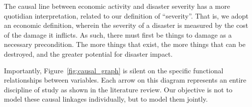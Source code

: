 The causal line between economic activity and disaster severity has a more quotidian interpretation, related to our definition of ``severity''. That is, we adopt an economic definition, wherein the severity of a disaster is measured by the cost of the damage it inflicts. As such, there must first be things to damage as a necessary precondition. The more things that exist, the more things that can be destroyed, and the greater potential for disaster impact.

Importantly, Figure~\ref{fig:causal_graph} is silent on the specific functional relationships between variables. Each arrow on this diagram represents an entire discipline of study as shown in the literature review. Our objective is not to model these causal linkages individually, but to model them jointly.
